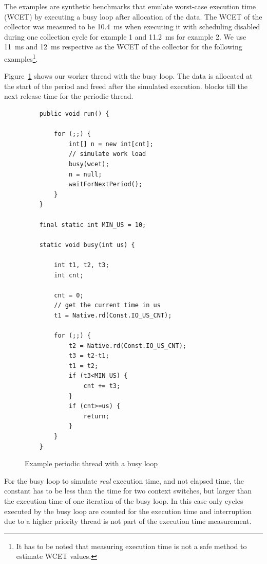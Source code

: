 The examples are synthetic benchmarks that emulate worst-case
execution time (WCET) by executing a busy loop after allocation of
the data. The WCET of the collector was measured to be 10.4~ms when
executing it with scheduling disabled during one collection cycle
for example 1 and 11.2~ms for example 2. We use 11~ms and 12~ms
respective as the WCET of the collector for the following
examples\footnote{It has to be noted that measuring execution time
is not a safe method to estimate WCET values.}.


Figure~\ref{fig:excode} shows our worker thread with the busy loop.
The data is allocated at the start of the period and freed after the
simulated execution.  blocks till the next
release time for the periodic thread.

\begin{figure}
\begin{center}
{\footnotesize
\begin{verbatim}
    public void run() {

        for (;;) {
            int[] n = new int[cnt];
            // simulate work load
            busy(wcet);
            n = null;
            waitForNextPeriod();
        }
    }

    final static int MIN_US = 10;

    static void busy(int us) {

        int t1, t2, t3;
        int cnt;

        cnt = 0;
        // get the current time in us
        t1 = Native.rd(Const.IO_US_CNT);

        for (;;) {
            t2 = Native.rd(Const.IO_US_CNT);
            t3 = t2-t1;
            t1 = t2;
            if (t3<MIN_US) {
                cnt += t3;
            }
            if (cnt>=us) {
                return;
            }
        }
    }

\end{verbatim}
}
    \caption{Example periodic thread with a busy loop}
\label{fig:excode}
\end{center}
\end{figure}

For the busy loop to simulate \emph{real} execution time, and not
elapsed time, the constant  has to be less than the
time for two context switches, but larger than the execution time of
one iteration of the busy loop. In this case only cycles executed by
the busy loop are counted for the execution time and interruption
due to a higher priority thread is not part of the execution time
measurement.

